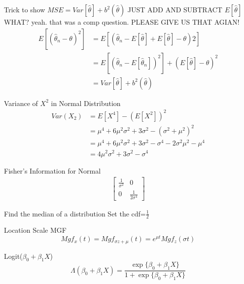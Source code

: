 \documentclass[avery5388,grid,frame]{flashcards}
\begin{document}
\begin{flashcard}{Trick to show $MSE=Var[\hat{\theta}]+b^2(\hat{\theta})$}
\bigskip\bigskip\bigskip
JUST ADD AND SUBTRACT $E[\hat{\theta}]$ WHAT? yeah. that was a comp question. PLEASE GIVE US THAT AGIAN!
{\begin{align*}
E[(\hat{\theta}_n-\theta)^2]&=E[(\hat{\theta}_n-E[\hat{\theta}]+E[\hat{\theta}]-\theta)2]\\
&=E[(\hat{\theta}_n-E[\hat{\theta}_n])^2]+(E[\hat{\theta}]-\theta)^2\\
&=Var[\hat{\theta}]+b^2(\hat{\theta})
\end{align*}}
\end{flashcard}
\begin{flashcard}{Variance of $X^2$ in Normal Distribution}
\bigskip\bigskip\bigskip
{\begin{align*}
Var(X_2)&=E[X^4]-(E[X^2])^2\\
&=\mu^4+6\mu^2\sigma^2+3\sigma^2-(\sigma^2+\mu^2)^2\\
&=\mu^4+6\mu^2\sigma^2+3\sigma^2-\sigma^4-2\sigma^2\mu^2-\mu^4\\
&=4\mu^2\sigma^2+3\sigma^2-\sigma^4
\end{align*}}
\end{flashcard}
\begin{flashcard}{Fisher's Information for Normal}
\bigskip\bigskip\bigskip
\huge{{\begin{align*}
\begin{bmatrix}
\frac{1}{\sigma^2}&0\\
0&\frac{1}{2\sigma^4}
\end{bmatrix}
\end{align*}}}
\end{flashcard}
\begin{flashcard}{Find the median of a distribution}
\bigskip\bigskip\bigskip
\huge{
Set the cdf=$\frac{1}{2}$
}
\end{flashcard}
\begin{flashcard}{Location Scale MGF}
\bigskip\bigskip\bigskip
\begin{equation*}
Mgf_x(t)=Mgf_{\sigma z+\mu}(t)=e^{\mu t}Mgf_z(\sigma t)
\end{equation*}
\end{flashcard}
\begin{flashcard}{Logit($\beta_0+\beta_1X$)}
\bigskip\bigskip\bigskip
\begin{equation*}
\Lambda(\beta_0+\beta_1X)=\frac{\exp\{\beta_0+\beta_1X\}}{1+\exp\{\beta_0+\beta_1X\}}
\end{equation*}
\end{flashcard}
\end{document}
